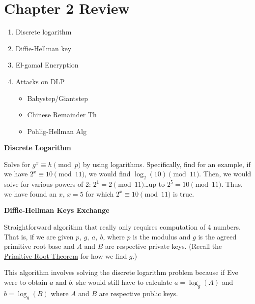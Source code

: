 \setcounter{chapter}{99}
\setcounter{ExampleCounter}{50}


\section*{Chapter 2 Review}

\begin{enumerate}
    \item Discrete logarithm
    \item Diffie-Hellman key
    \item El-gamal Encryption
    \item Attacks on DLP
          \begin{itemize}
              \item Babystep/Giantstep
              \item Chinese Remainder Th
              \item Pohlig-Hellman Alg
          \end{itemize}
\end{enumerate}



\begin{center}
    \textbf{Discrete Logarithm}
\end{center}

Solve for \(g^x \equiv h \pmod{p}\) by using logarithms. Specifically, find for an example, if we have \(2^x \equiv 10 \pmod{11}\), we would find \(\log_2(10) \pmod{11}\). Then, we would solve for various powers of 2: \(2^1 = 2 \pmod{11}\)\dots up to \(2^5 = 10 \pmod{11}\). Thus, we have found an \(x\), \(x = 5\) for which \(2^x \equiv 10 \pmod{11}\) is true.


\begin{center}
    \textbf{Diffie-Hellman Keys Exchange}
\end{center}

Straightforward algorithm that really only requires computation of 4 numbers. That is, if we are given \(p, \ g, \ a, \ b\), where \(p\) is the modulus and \(g\) is the agreed primitive root base and \(A\) and \(B\) are respective private keys. (Recall the \hyperlink{thm:Primitive Root Theorem}{Primitive Root Theorem} for how we find \(g\).)

This algorithm involves solving the discrete logarithm problem because if Eve were to obtain \(a\) and \(b\), she would still have to calculate \(a = \log_g(A)\) and \(b = \log_g(B)\) where \(A\) and \(B\) are respective public keys.

